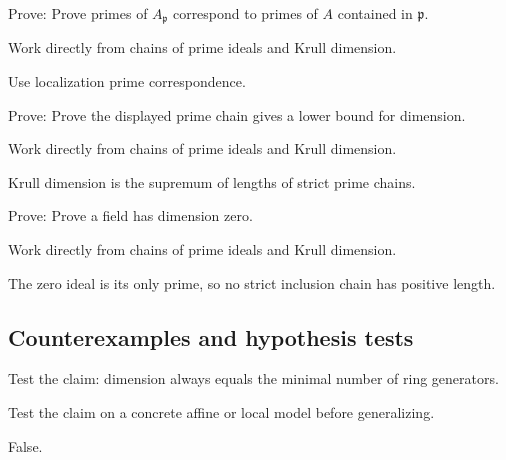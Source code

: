 \begin{exercise}\label{exr:vi29-expand-07}
Prove: Prove primes of $A_{\mathfrak p}$ correspond to primes of $A$ contained in $\mathfrak p$.
\end{exercise}
\begin{hint}
Work directly from chains of prime ideals and Krull dimension.
\end{hint}
\begin{solution}
Use localization prime correspondence.
\end{solution}

\begin{exercise}\label{exr:vi29-expand-08}
Prove: Prove the displayed prime chain gives a lower bound for dimension.
\end{exercise}
\begin{hint}
Work directly from chains of prime ideals and Krull dimension.
\end{hint}
\begin{solution}
Krull dimension is the supremum of lengths of strict prime chains.
\end{solution}

\begin{exercise}\label{exr:vi29-expand-09}
Prove: Prove a field has dimension zero.
\end{exercise}
\begin{hint}
Work directly from chains of prime ideals and Krull dimension.
\end{hint}
\begin{solution}
The zero ideal is its only prime, so no strict inclusion chain has positive length.
\end{solution}

\subsection*{Counterexamples and hypothesis tests}

\begin{exercise}\label{exr:vi29-expand-10}
Test the claim: dimension always equals the minimal number of ring generators.
\end{exercise}
\begin{hint}
Test the claim on a concrete affine or local model before generalizing.
\end{hint}
\begin{solution}
False.
\end{solution}

